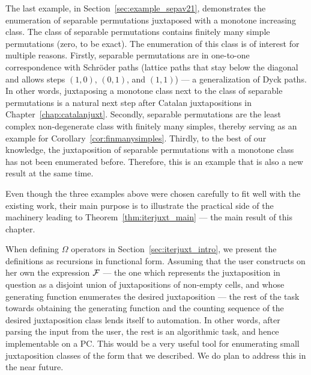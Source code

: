 \documentclass[12pt, a4paper, twoside]{report}
\begin{document}
The last example, in Section~\ref{sec:example_sepav21}, demonstrates the enumeration of separable permutations juxtaposed with a monotone increasing class. The class of separable permutations contains finitely many simple permutations (zero, to be exact). The enumeration of this class is of interest for multiple reasons. Firstly, separable permutations are in one-to-one correspondence with Schr\"{o}der paths (lattice paths that stay below the diagonal and allows steps $(1,0)$, $(0,1)$, and $(1,1)$) --- a generalization of Dyck paths. In other words, juxtaposing a monotone class next to the class of separable permutations is a natural next step after Catalan juxtapositions in Chapter~\ref{chap:catalanjuxt}. Secondly, separable permutations are the least complex non-degenerate class with finitely many simples, thereby serving as an example for Corollary~\ref{cor:finmanysimples}. Thirdly, to the best of our knowledge, the juxtaposition of separable permutations with a monotone class has not been enumerated before. Therefore, this is an example that is also a new result at the same time.

Even though the three examples above were chosen carefully to fit well with the existing work, their main purpose is to illustrate the practical side of the machinery leading to Theorem~\ref{thm:iterjuxt_main} --- the main result of this chapter.


When defining $\Omega$ operators in Section~\ref{sec:iterjuxt_intro}, we present the definitions as recursions in functional form. Assuming that the user constructs on her own the expression $\mathcal{F}$ --- the one which represents the juxtaposition in question as a disjoint union of juxtapositions of non-empty cells, and whose generating function enumerates the desired juxtaposition --- the rest of the task towards obtaining the generating function and the counting sequence of the desired juxtaposition class lends itself to automation. In other words, after parsing the input from the user, the rest is an algorithmic task, and hence implementable on a PC. This would be a very useful tool for enumerating small juxtaposition classes of the form that we described. We do plan to address this in the near future.
\end{document}
